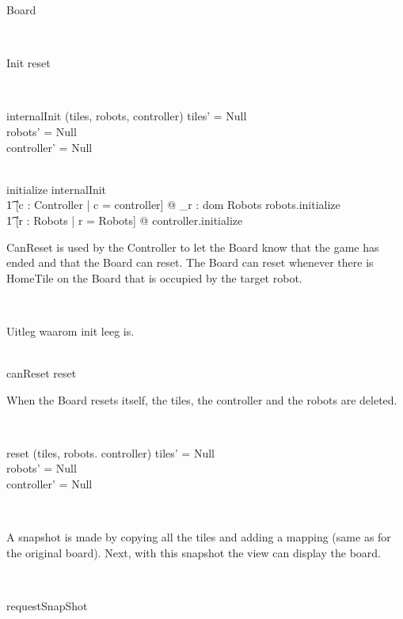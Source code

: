 \begin{class}{Board}
\begin{classcom}
\end{classcom} \\
\begin{schema}{Init}
reset
\end{schema} \\
\begin{schema}{internalInit}
\Delta (tiles, robots, controller)
\where
tiles' \not = Null \\
robots' \not = Null \\
controller' \not = Null
\end{schema} \\
initialize \sdef internalInit \; \comp \\ \t1
[c : Controller | c = controller] @ \bigwedge_{r : dom Robots} robots.initialize \; \comp \\ \t1
[r : \power Robots | r = \dom Robots] @ controller.initialize \\
\znewpage
\begin{classcom}
CanReset is used by the Controller to let the Board know that the game has ended and that the Board can reset. The Board can reset whenever there is HomeTile on the Board that is occupied by the target robot.
\end{classcom} \\
\begin{classcom}
Uitleg waarom init leeg is.
\end{classcom} \\
canReset \sdef [\exists t : \ran tiles | t \in HomeTileTiles @ \\
\t1 t.target = t.occupier] \wedge reset \\
\begin{classcom}
When the Board resets itself, the tiles, the controller and the robots are deleted.
\end{classcom} \\
\begin{schema}{reset}
\Delta (tiles, robots. controller)
\where
tiles' = Null \\
robots' = Null \\
controller' = Null
\end{schema} \\
\begin{classcom}
A snapshot is made by copying all the tiles and adding a mapping (same as for the original board). Next, with this snapshot the view can display the board.
\end{classcom} \\
\begin{schema}{requestSnapShot}

\end{schema}
\end{class}
